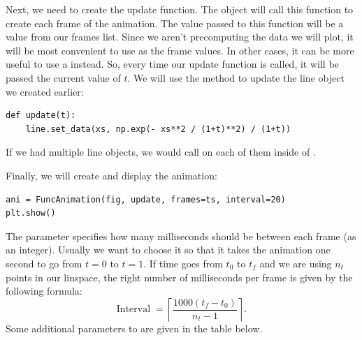 Next, we need to create the update function.
The  object will call this function to create each frame of the animation.
The value passed to this function will be a value from our frames list.
Since we aren't precomputing the data we will plot, it will be most convenient to use  as the frame values.
In other cases, it can be more useful to use a  instead.
So, every time our update function is called, it will be passed the current value of $t$.
We will use the  method to update the line object we created earlier:
\begin{lstlisting}
def update(t):
    line.set_data(xs, np.exp(- xs**2 / (1+t)**2) / (1+t))
\end{lstlisting}
If we had multiple line objects, we would call  on each of them inside of .

Finally, we will create and display the animation:
\begin{lstlisting}
ani = FuncAnimation(fig, update, frames=ts, interval=20)
plt.show()
\end{lstlisting}
The  parameter specifies how many milliseconds should be between each frame (as an integer).
Usually we want to choose it so that it takes the animation one second to go from $t=0$ to $t=1$.
If time goes from $t_0$ to $t_f$ and we are using $n_t$ points in our linspace, the right number of milliseconds per frame is given by the following formula:
\[
\text{Interval} \;=
\left\lceil
\frac{1000(t_f-t_0)}{n_t-1}
\right\rceil.
\]
Some additional parameters to  are given in the table below.

